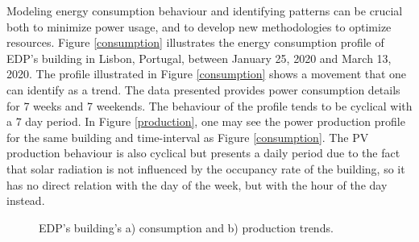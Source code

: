 Modeling energy consumption behaviour and identifying patterns can be crucial both to minimize power usage, and to develop new methodologies to optimize resources. Figure \ref{consumption} illustrates the energy consumption profile of \ac{EDP}'s building in Lisbon, Portugal, between January 25, 2020 and March 13, 2020. The profile illustrated in Figure \ref{consumption} shows a movement that one can identify as a trend. The data presented provides power consumption details for 7 weeks and 7 weekends. The behaviour of the profile tends to be cyclical with a 7 day period. In Figure \ref{production}, one may see the power production profile for the same building and time-interval as Figure \ref{consumption}. The \ac{PV} production behaviour is also cyclical but presents a daily period due to the fact that solar radiation is not influenced by the occupancy rate of the building, so it has no direct relation with the day of the week, but with the hour of the day instead.



\begin{figure}[h!]
\captionsetup[subfigure]{position=b}
\centering
{}
\hspace{0.05\textwidth}
\caption{EDP's building's a) consumption and b) production trends.}
\end{figure}


